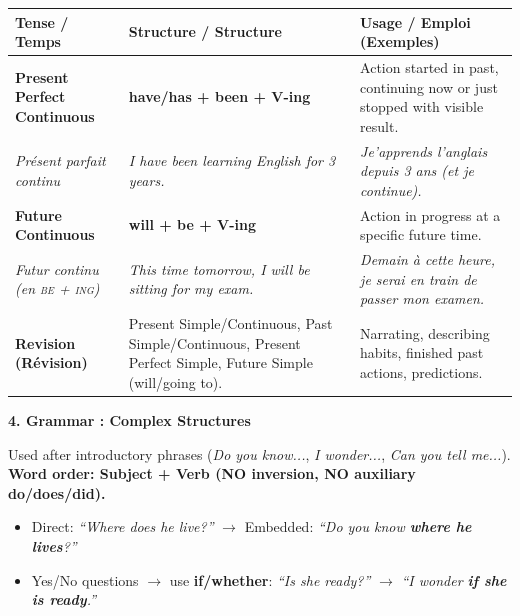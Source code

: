 \documentclass[11pt]{article}
\begin{document}
\begin{bilan}
\begin{center}
\begin{tabularx}{\linewidth}{|l|X|X|}\hline
\rowcolor{popblueL}
\textbf{Tense / Temps} & \textbf{Structure / Structure} & \textbf{Usage / Emploi (Exemples)} \\ \hline
\textbf{Present Perfect Continuous} & \textbf{have/has + been + V-ing} & Action started in past, continuing now or just stopped with visible result. \\
\emph{Présent parfait continu} & \emph{I have been learning English for 3 years.} & \emph{Je'apprends l'anglais depuis 3 ans (et je continue).} \\ \hline
\textbf{Future Continuous} & \textbf{will + be + V-ing} & Action in progress at a specific future time. \\
\emph{Futur continu (en \textsc{be} + \textsc{ing})} & \emph{This time tomorrow, I will be sitting for my exam.} & \emph{Demain à cette heure, je serai en train de passer mon examen.} \\ \hline
\textbf{Revision (Révision)} & Present Simple/Continuous, Past Simple/Continuous, Present Perfect Simple, Future Simple (will/going to). & Narrating, describing habits, finished past actions, predictions. \\ \hline
\end{tabularx}
\end{center}

\textbf{4. Grammar : Complex Structures}

\begin{definition}
Used after introductory phrases (\emph{Do you know...}, \emph{I wonder...}, \emph{Can you tell me...}). \textbf{Word order: Subject + Verb (NO inversion, NO auxiliary do/does/did).}
\begin{itemize}
  \item Direct: \emph{``Where does he live?''} $\rightarrow$ Embedded: \emph{``Do you know \textbf{where he lives}?''}
  \item Yes/No questions $\rightarrow$ use \textbf{if/whether}: \emph{``Is she ready?''} $\rightarrow$ \emph{``I wonder \textbf{if she is ready}.''}
\end{itemize}
\end{definition}


\end{bilan}
\end{document}
